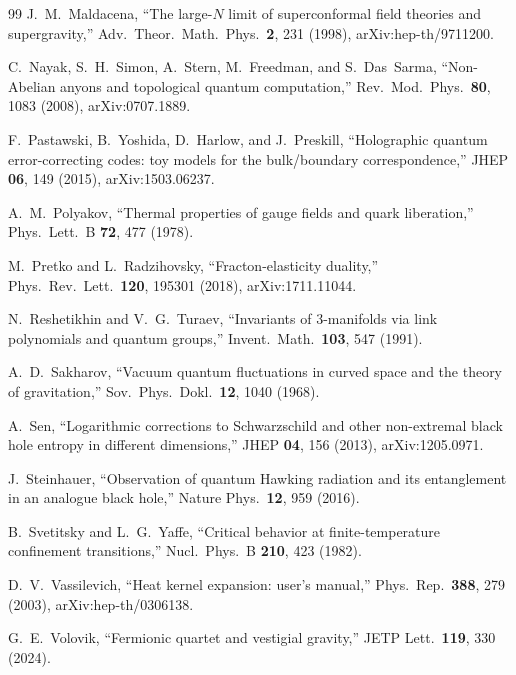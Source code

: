 \documentclass[aps,prd,reprint,nofootinbib,superscriptaddress]{revtex4-2}
\begin{document}
\begin{thebibliography}{99}
J.~M.~Maldacena,
``The large-$N$ limit of superconformal field theories and supergravity,''
Adv.\ Theor.\ Math.\ Phys.\ \textbf{2}, 231 (1998),
arXiv:hep-th/9711200.

C.~Nayak, S.~H.~Simon, A.~Stern, M.~Freedman, and S.~Das~Sarma,
``Non-Abelian anyons and topological quantum computation,''
Rev.\ Mod.\ Phys.\ \textbf{80}, 1083 (2008),
arXiv:0707.1889.

F.~Pastawski, B.~Yoshida, D.~Harlow, and J.~Preskill,
``Holographic quantum error-correcting codes: toy models for the
bulk/boundary correspondence,''
JHEP \textbf{06}, 149 (2015),
arXiv:1503.06237.

A.~M.~Polyakov,
``Thermal properties of gauge fields and quark liberation,''
Phys.\ Lett.\ B \textbf{72}, 477 (1978).

M.~Pretko and L.~Radzihovsky,
``Fracton-elasticity duality,''
Phys.\ Rev.\ Lett.\ \textbf{120}, 195301 (2018),
arXiv:1711.11044.

N.~Reshetikhin and V.~G.~Turaev,
``Invariants of $3$-manifolds via link polynomials and quantum groups,''
Invent.\ Math.\ \textbf{103}, 547 (1991).

A.~D.~Sakharov,
``Vacuum quantum fluctuations in curved space and the theory of
gravitation,''
Sov.\ Phys.\ Dokl.\ \textbf{12}, 1040 (1968).

A.~Sen,
``Logarithmic corrections to Schwarzschild and other non-extremal black
hole entropy in different dimensions,''
JHEP \textbf{04}, 156 (2013),
arXiv:1205.0971.

J.~Steinhauer,
``Observation of quantum Hawking radiation and its entanglement in an
analogue black hole,''
Nature Phys.\ \textbf{12}, 959 (2016).

B.~Svetitsky and L.~G.~Yaffe,
``Critical behavior at finite-temperature confinement transitions,''
Nucl.\ Phys.\ B \textbf{210}, 423 (1982).

D.~V.~Vassilevich,
``Heat kernel expansion: user's manual,''
Phys.\ Rep.\ \textbf{388}, 279 (2003),
arXiv:hep-th/0306138.

G.~E.~Volovik,
``Fermionic quartet and vestigial gravity,''
JETP Lett.\ \textbf{119}, 330 (2024).


\end{thebibliography}
\end{document}
